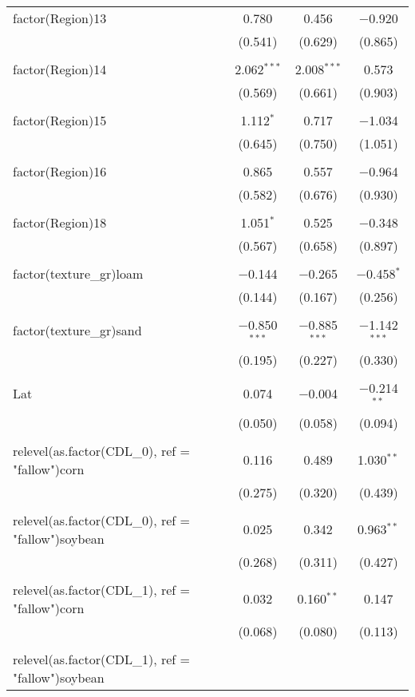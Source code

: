 \begin{table}[!htbp]
\begin{tabular}{@{\extracolsep{5pt}}lccc}
 factor(Region)13 & 0.780 & 0.456 & $-$0.920 \\ 
  & (0.541) & (0.629) & (0.865) \\ 
  & & & \\ 
 factor(Region)14 & 2.062$^{***}$ & 2.008$^{***}$ & 0.573 \\ 
  & (0.569) & (0.661) & (0.903) \\ 
  & & & \\ 
 factor(Region)15 & 1.112$^{*}$ & 0.717 & $-$1.034 \\ 
  & (0.645) & (0.750) & (1.051) \\ 
  & & & \\ 
 factor(Region)16 & 0.865 & 0.557 & $-$0.964 \\ 
  & (0.582) & (0.676) & (0.930) \\ 
  & & & \\ 
 factor(Region)18 & 1.051$^{*}$ & 0.525 & $-$0.348 \\ 
  & (0.567) & (0.658) & (0.897) \\ 
  & & & \\ 
 factor(texture\_gr)loam & $-$0.144 & $-$0.265 & $-$0.458$^{*}$ \\ 
  & (0.144) & (0.167) & (0.256) \\ 
  & & & \\ 
 factor(texture\_gr)sand & $-$0.850$^{***}$ & $-$0.885$^{***}$ & $-$1.142$^{***}$ \\ 
  & (0.195) & (0.227) & (0.330) \\ 
  & & & \\ 
 Lat & 0.074 & $-$0.004 & $-$0.214$^{**}$ \\ 
  & (0.050) & (0.058) & (0.094) \\ 
  & & & \\ 
 relevel(as.factor(CDL\_0), ref = "fallow")corn & 0.116 & 0.489 & 1.030$^{**}$ \\ 
  & (0.275) & (0.320) & (0.439) \\ 
  & & & \\ 
 relevel(as.factor(CDL\_0), ref = "fallow")soybean & 0.025 & 0.342 & 0.963$^{**}$ \\ 
  & (0.268) & (0.311) & (0.427) \\ 
  & & & \\ 
 relevel(as.factor(CDL\_1), ref = "fallow")corn & 0.032 & 0.160$^{**}$ & 0.147 \\ 
  & (0.068) & (0.080) & (0.113) \\ 
  & & & \\ 
 relevel(as.factor(CDL\_1), ref = "fallow")soybean &  &  &  \\ 

\end{tabular}
\end{table}
